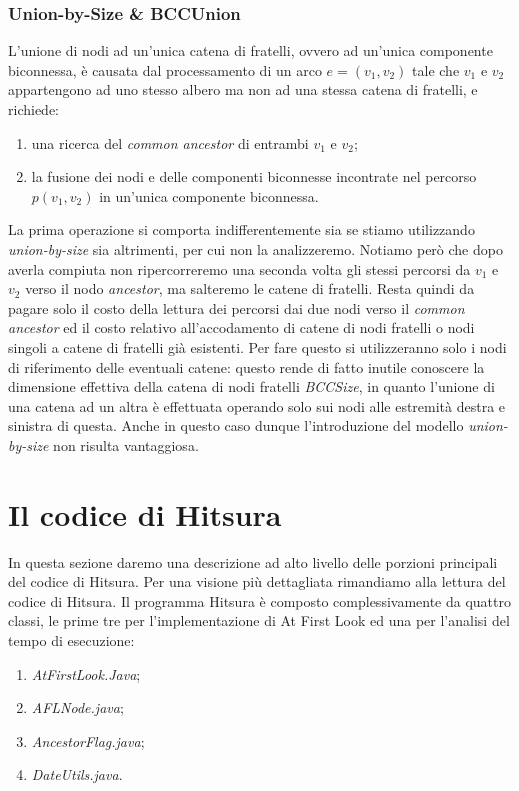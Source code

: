 \documentclass[a4paper,11pt]{report}
\begin{document}
\subsubsection{Union-by-Size \& BCCUnion}
L'unione di nodi ad un'unica catena di fratelli, ovvero ad un'unica componente biconnessa, è causata dal processamento di un arco
$e=\left(v_1,v_2\right)$ tale che $v_1$ e $v_2$ 
appartengono ad uno stesso albero ma non ad una stessa catena di fratelli, e richiede:
\begin{enumerate}
 \item una ricerca del \emph{common ancestor} di entrambi $v_1$ e $v_2$;
 \item la fusione dei nodi e delle componenti biconnesse incontrate nel percorso $p\left(v_1,v_2\right)$ in un'unica componente biconnessa.
\end{enumerate}
La prima operazione si comporta indifferentemente sia se stiamo utilizzando \emph{union-by-size} sia altrimenti, per cui non la
analizzeremo. Notiamo però che dopo averla compiuta non
ripercorreremo una seconda volta gli stessi percorsi da $v_1$ e $v_2$ verso il nodo \emph{ancestor}, ma salteremo le catene di fratelli.
Resta quindi da pagare solo il costo della lettura
dei percorsi dai due nodi verso il \emph{common ancestor} ed il costo relativo all'accodamento di catene di nodi fratelli o nodi singoli a
catene di fratelli già esistenti.
Per fare questo si utilizzeranno solo i nodi di riferimento delle eventuali catene: questo rende di fatto inutile conoscere la dimensione
effettiva della catena di nodi fratelli
\emph{BCCSize}, in quanto l'unione di una catena ad un altra è effettuata operando solo sui nodi alle estremità destra e sinistra di questa.
Anche in questo caso dunque l'introduzione del modello \emph{union-by-size} non risulta vantaggiosa.



\section{Il codice di Hitsura}
In questa sezione daremo una descrizione ad alto livello delle porzioni principali del codice di Hitsura. Per una visione più dettagliata
rimandiamo alla lettura del codice di Hitsura.
Il programma Hitsura è composto complessivamente da quattro classi, le prime tre per l'implementazione di At First Look ed una per l'analisi
del tempo di esecuzione:
\begin{enumerate}
 \item \emph{AtFirstLook.Java};
 \item \emph{AFLNode.java};
 \item \emph{AncestorFlag.java};
 \item \emph{DateUtils.java}.
\end{enumerate}
\end{document}

